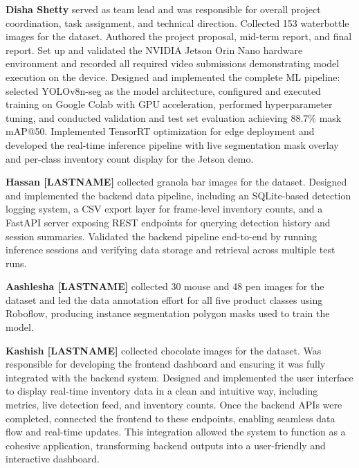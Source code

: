 \documentclass[10pt,twocolumn,letterpaper]{article}
\begin{document}
\noindent\textbf{Disha Shetty} served as team lead and
was responsible for overall project coordination, task
assignment, and technical direction. Collected 153
waterbottle images for the dataset. Authored the project
proposal, mid-term report, and final report. Set up and
validated the NVIDIA Jetson Orin Nano hardware environment
and recorded all required video submissions demonstrating
model execution on the device. Designed and implemented
the complete ML pipeline: selected YOLOv8n-seg as the
model architecture, configured and executed training on
Google Colab with GPU acceleration, performed
hyperparameter tuning, and conducted validation and
test set evaluation achieving 88.7\% mask mAP@50.
Implemented TensorRT optimization for edge deployment
and developed the real-time inference pipeline with live
segmentation mask overlay and per-class inventory count
display for the Jetson demo.

\noindent\textbf{Hassan [LASTNAME]} collected granola bar
images for the dataset. Designed and implemented the
backend data pipeline, including an SQLite-based detection
logging system, a CSV export layer for frame-level
inventory counts, and a FastAPI server exposing REST
endpoints for querying detection history and session
summaries. Validated the backend pipeline end-to-end by
running inference sessions and verifying data storage and
retrieval across multiple test runs.

\noindent\textbf{Aashlesha [LASTNAME]} collected 30 mouse
and 48 pen images for the dataset and led the data
annotation effort for all five product classes using
Roboflow, producing instance segmentation polygon masks
used to train the model.

\noindent\textbf{Kashish [LASTNAME]} collected chocolate
images for the dataset. Was responsible for developing
the frontend dashboard and ensuring it was fully
integrated with the backend system. Designed and
implemented the user interface to display real-time
inventory data in a clean and intuitive way, including
metrics, live detection feed, and inventory counts. Once
the backend APIs were completed, connected the frontend
to these endpoints, enabling seamless data flow and
real-time updates. This integration allowed the system
to function as a cohesive application, transforming
backend outputs into a user-friendly and interactive
dashboard.
\end{document}
